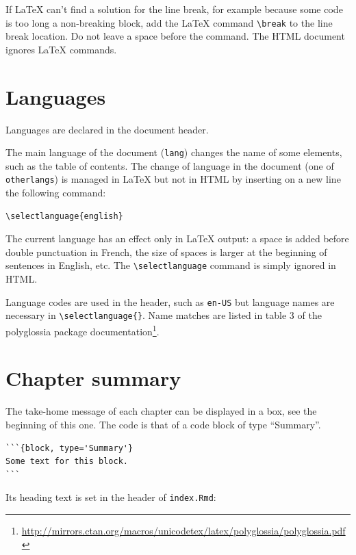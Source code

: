 \documentclass[
  12pt,
  american,
  a4paper,
  extrafontsizes,onecolumn,openright
  ]{memoir}
\begin{document}
If LaTeX can't find a solution for the line break, for example because some code is too long a non-breaking block, add the LaTeX command \texttt{\textbackslash{}break} to the line break location.
Do not leave a space before the command.
The HTML document ignores LaTeX commands.

\hypertarget{sec:languages}{%
\section{Languages}\label{sec:languages}}

Languages are declared in the document header.

The main language of the document (\texttt{lang}) changes the name of some elements, such as the table of contents.
The change of language in the document (one of \texttt{otherlangs}) is managed in LaTeX but not in HTML by inserting on a new line the following command:

\begin{verbatim}
\selectlanguage{english}
\end{verbatim}

The current language has an effect only in LaTeX output: a space is added before double punctuation in French, the size of spaces is larger at the beginning of sentences in English, etc.
The \texttt{\textbackslash{}selectlanguage} command is simply ignored in HTML.

Language codes are used in the header, such as \texttt{en-US} but language names are necessary in \texttt{\textbackslash{}selectlanguage\{\}}.
Name matches are listed in table 3 of the polyglossia package documentation\footnote{\url{http://mirrors.ctan.org/macros/unicodetex/latex/polyglossia/polyglossia.pdf}}.

\hypertarget{chapter-summary}{%
\section{Chapter summary}\label{chapter-summary}}

The take-home message of each chapter can be displayed in a box, see the beginning of this one.
The code is that of a code block of type \enquote{Summary}.

\begin{verbatim}
```{block, type='Summary'}
Some text for this block.
```
\end{verbatim}

Its heading text is set in the header of \texttt{index.Rmd}:
\end{document}
